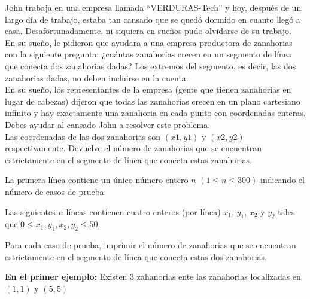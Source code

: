 
John trabaja en una empresa llamada ``VERDURAS-Tech'' y hoy, después de un largo día de trabajo, estaba tan cansado que se quedó dormido en cuanto llegó a casa. Desafortunadamente, ni siquiera en sueños pudo olvidarse de su trabajo.\\

En su sueño, le pidieron que ayudara a una empresa productora de zanahorias con la siguiente pregunta: ¿cuántas zanahorias crecen en un segmento de línea que conecta dos zanahorias dadas? Los extremos del segmento, es decir, las dos zanahorias dadas, no deben incluirse en la cuenta. \\

En su sueño, los representantes de la empresa (gente que tienen zanahorias en lugar de cabezas) dijeron que todas las zanahorias crecen en un plano cartesiano infinito y hay exactamente una zanahoria en cada punto con coordenadas enteras. Debes ayudar al cansado John a resolver este problema.\\

Las coordenadas de las dos zanahorias son $(x1, y1)$ y $(x2, y2)$ respectivamente. Devuelve el número de zanahorias que se encuentran estrictamente en el segmento de línea que conecta estas zanahorias.


La primera línea contiene un único número entero $n$ $(1 \le n \le 300)$ indicando el número de casos de prueba.

Las siguientes $n$ líneas contienen cuatro enteros (por línea) $x_1$, $y_1$, $x_2$ y $y_2$ tales que $0 \leq x_1, y_1, x_2, y_2 \leq 50$.

\outputText

Para cada caso de prueba, imprimir el número de zanahorias que se encuentran estrictamente en el segmento de línea que conecta estas dos zanahorias.

\exampleCases

\begin{example}
\end{example}

\explanationText

\textbf{En el primer ejemplo:} Existen $3$ zahanorias ente las zanahorias localizadas en $(1,1)$ y $(5, 5)$

\begin{figure}[h]
    \centering
    
\end{figure}